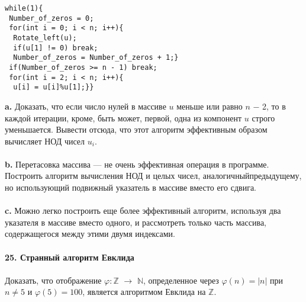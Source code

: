 \begin{lstlisting}[mathescape=true]
while(1){ 
 Number_of_zeros = 0; 
 for(int i = 0; i < n; i++){ 
  Rotate_left(u); 
  if(u[1] != 0) break; 
  Number_of_zeros = Number_of_zeros + 1;} 
 if(Number_of_zeros >= n - 1) break; 
 for(int i = 2; i < n; i++){ 
  u[i] = u[i]%u[1];}}
\end{lstlisting}
 \hspace*{10pt}\textbf{a.} Доказать, что если число нулей в массиве $u$ меньше или равно \linebreak
  $n$ $-$ 2, то в каждой итерации, кроме, быть может, первой, одна из\linebreak
компонент $u$ строго уменьшается. Вывести отсюда, что этот алгоритм\linebreak
эффективным образом вычисляет НОД чисел $u_i$.\\\\
 \hspace*{10pt}\textbf{b.} Перетасовка массива — не очень эффективная операция в программе.\linebreak
 Построить алгоритм вычисления НОД и целых чисел, аналогичный\linebreak предыдущему, но использующий подвижный указатель в \linebreak массиве вместо его сдвига.\\\\
  \hspace*{10pt}\textbf{c.} Можно легко построить еще более эффективный алгоритм,\linebreak
   используя два указателя в массиве вместо одного, и рассмотреть только\linebreak
часть массива, содержащегося между этими двумя индексами.\\
\\
\noindent\textbf{25. Странный алгоритм Евклида}\\\\
\hspace*{10pt} 
Доказать, что отображение $\varphi : \mathbb{Z}$ $\rightarrow$ $\mathbb {N}$, определенное через $\varphi(n) = |n|$\linebreak
при $n \neq 5$  и $\varphi(5) = 100$, является алгоритмом Евклида на $\mathbb{Z}$.\pagebreak


